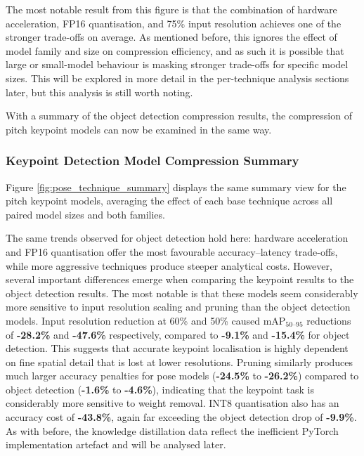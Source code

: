 The most notable result from this figure is that the combination of hardware acceleration, FP16 quantisation, and 75\% input resolution achieves one of the stronger trade-offs on average. As mentioned before, this ignores the effect of model family and size on compression efficiency, and as such it is possible that large or small-model behaviour is masking stronger trade-offs for specific model sizes. This will be explored in more detail in the per-technique analysis sections later, but this analysis is still worth noting. 

With a summary of the object detection compression results, the compression of pitch keypoint models can now be examined in the same way.
\subsubsection{Keypoint Detection Model Compression Summary}
Figure \ref{fig:pose_technique_summary} displays the same summary view for the pitch keypoint models, averaging the effect of each base technique across all paired model sizes and both families.



The same trends observed for object detection hold here: hardware acceleration and FP16 quantisation offer the most favourable accuracy--latency trade-offs, while more aggressive techniques produce steeper analytical costs. However, several important differences emerge when comparing the keypoint results to the object detection results. The most notable is that these models seem considerably more sensitive to input resolution scaling and pruning than the object detection models. Input resolution reduction at 60\% and 50\% caused mAP$_{50\text{--}95}$ reductions of \textbf{-28.2\%} and \textbf{-47.6\%} respectively, compared to \textbf{-9.1\%} and \textbf{-15.4\%} for object detection. This suggests that accurate keypoint localisation is highly dependent on fine spatial detail that is lost at lower resolutions. Pruning similarly produces much larger accuracy penalties for pose models (\textbf{-24.5\%} to \textbf{-26.2\%}) compared to object detection (\textbf{-1.6\%} to \textbf{-4.6\%}), indicating that the keypoint task is considerably more sensitive to weight removal. INT8 quantisation also has an accuracy cost of \textbf{-43.8\%}, again far exceeding the object detection drop of \textbf{-9.9\%}. As with before, the knowledge distillation data reflect the inefficient PyTorch implementation artefact and will be analysed later. 

